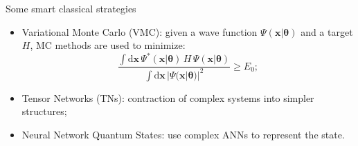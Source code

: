 \documentclass[aspectratio=169, 10pt, xcolor={svgnames}, hyperref={linkcolor=black}]{beamer}
\begin{document}
\begin{frame}{Some smart classical strategies}
   \begin{itemize}[noitemsep]
      \item<2,3,4>[1.] Variational Monte Carlo (VMC): given a wave function $\Psi(\bm{x}|\bm{\theta})$ and a target $H$, MC methods are used to minimize:
      $$ \frac{\int \text{d}\bm{x}\, \Psi^*(\bm{x}|\bm{\theta})\, H \,
      \Psi(\bm{x}|\bm{\theta})}{\int \text{d}\bm{x}\, |\Psi(\bm{x}|\bm{\theta})|^2}\geq E_0; $$
      \item<3,4>[2.] Tensor Networks (TNs): contraction of complex systems into simpler structures;
      \item<4>[3.] Neural Network Quantum States: use complex ANNs to represent the state.
   \end{itemize}
   \begin{multicols}{3}
   \begin{figure}
\end{figure}
\end{multicols}
\end{frame}
\end{document}
